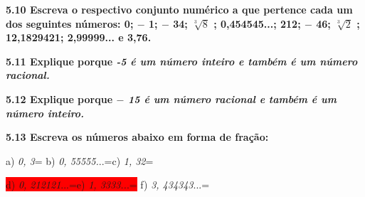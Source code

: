 \documentclass[12pt]{article}
\renewcommand{\_}{\kern-1.5pt\textunderscore\kern-1.5pt}
\begin{document}
\textbf{5.10 Escreva o respectivo conjunto numérico a que pertence cada um dos seguintes números:  0; $-$ 1; $-$ 34;  \( \sqrt[3]{8} \) ; 0,454545...; 212; $-$ 46;  \( \sqrt[3]{2} \) ; 12,1829421; 2,99999... e 3,76.}\par

\textbf{5.11 Explique porque \textit{-5 é um número inteiro e também é um número racional.}}\par

\textbf{5.12 Explique porque \textit{$-$ 15 é um número racional e também é um número inteiro.}}\par

\textbf{5.13 Escreva os números abaixo em forma de fração:}\par

\begin{adjustwidth}{0.3in}{0.0in}
\tab a) \textit{0, 3}= \tab \tab \tab b) \textit{0, 55555.}..=\tab \tab \tab c) \textit{1, 32}= \tab \tab \par

\end{adjustwidth}

\begin{adjustwidth}{0.3in}{0.0in}
\tab \colorbox{Red}{d) \textit{0, 212121}...=\tab \tab e) \textit{1, 3333..}.=} \tab \tab \tab f) \textit{3, 434343}...=\par

\end{adjustwidth}
\end{document}

